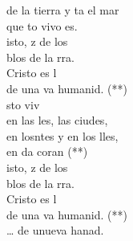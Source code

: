 \begin{cancion}
\begin{chorus}
	de la tierra y ta el mar\\
	que to vivo es. \\
\jump
	isto, z de los \\
	blos de la rra.\\
	Cristo es l \\
	de una va humanid. (**)\\
	sto viv\\
	en las les, las ciudes,\\
	en losntes y en los lles,\\
	en da coran (**) \\
	isto, z de los \\
	blos de la rra.\\
	Cristo es l \\
	de una va humanid. (**)\\
	… de unueva hanad.\\
	\end{chorus}%
	\jump\\
\end{cancion}%
